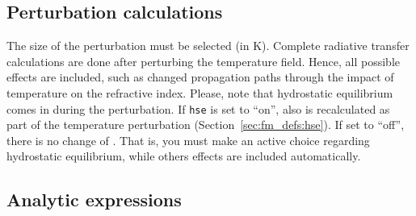 \subsection{Perturbation calculations}
%
The size of the perturbation must be selected (in K).
Complete radiative transfer calculations are done after perturbing the
temperature field. Hence, all possible effects are included, such as changed
propagation paths through the impact of temperature on the refractive index.
Please, note that hydrostatic equilibrium comes in during the perturbation. If
\verb|hse| is set to ``on'', also  is recalculated as part
of the temperature perturbation (Section~\ref{sec:fm_defs:hse}). If set to
``off'', there is no change of . That is, you must make an
active choice regarding hydrostatic equilibrium, while others effects are
included automatically.


\subsection{Analytic expressions}
%
